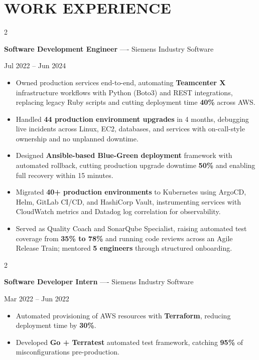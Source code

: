\documentclass[10pt, letterpaper]{article}
\newenvironment{highlights}{
    \begin{itemize}[
        topsep=0.10 cm,
        parsep=0.06 cm,
        partopsep=0pt,
        itemsep=0.06 cm,
        leftmargin=12pt
    ]
}{
    \end{itemize}
}
\newenvironment{twocolentry}[2][]{
    \onecolentry
    \def\secondColumn{#2}
    \setcolumnwidth{\fill, 4.5 cm}
    \begin{paracol}{2}
}{
    \switchcolumn \raggedleft \secondColumn
    \end{paracol}
    \endonecolentry
}
\begin{document}
\section{WORK EXPERIENCE}
\begin{twocolentry}{Jul 2022 -- Jun 2024}
\textbf{Software Development Engineer} ---- Siemens Industry Software
\end{twocolentry}
\begin{highlights}
  \item Owned production services end-to-end, automating \textbf{Teamcenter X} infrastructure workflows with Python (Boto3) and REST integrations, replacing legacy Ruby scripts and cutting deployment time \textbf{40\%} across AWS.
  \item Handled \textbf{44 production environment upgrades} in 4 months, debugging live incidents across Linux, EC2, databases, and services with on-call-style ownership and no unplanned downtime.
  \item Designed \textbf{Ansible-based Blue-Green deployment} framework with automated rollback, cutting production upgrade downtime \textbf{50\%} and enabling full recovery within 15 minutes.
  \item Migrated \textbf{40+ production environments} to Kubernetes using ArgoCD, Helm, GitLab CI/CD, and HashiCorp Vault, instrumenting services with CloudWatch metrics and Datadog log correlation for observability.
  \item Served as Quality Coach and SonarQube Specialist, raising automated test coverage from \textbf{35\% to 78\%} and running code reviews across an Agile Release Train; mentored \textbf{5 engineers} through structured onboarding.
\end{highlights}

\vspace{0.15 cm}

\begin{twocolentry}{Mar 2022 -- Jun 2022}
\textbf{Software Developer Intern} ---- Siemens Industry Software
\end{twocolentry}
\begin{highlights}
  \item Automated provisioning of AWS resources with \textbf{Terraform}, reducing deployment time by \textbf{30\%}.
  \item Developed \textbf{Go + Terratest} automated test framework, catching \textbf{95\%} of misconfigurations pre-production.
\end{highlights}
\end{document}
